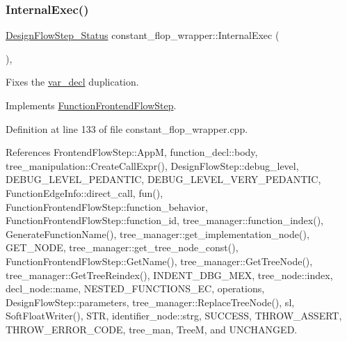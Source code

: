 \subsubsection{\texorpdfstring{Internal\+Exec()}{InternalExec()}}
{\footnotesize\ttfamily \hyperlink{design__flow__step_8hpp_afb1f0d73069c26076b8d31dbc8ebecdf}{Design\+Flow\+Step\+\_\+\+Status} constant\+\_\+flop\+\_\+wrapper\+::\+Internal\+Exec (\begin{DoxyParamCaption}{ }\end{DoxyParamCaption})\hspace{0.3cm}{\ttfamily [override]}, {\ttfamily [virtual]}}



Fixes the \hyperlink{structvar__decl}{var\+\_\+decl} duplication. 



Implements \hyperlink{classFunctionFrontendFlowStep_a00612f7fb9eabbbc8ee7e39d34e5ac68}{Function\+Frontend\+Flow\+Step}.



Definition at line 133 of file constant\+\_\+flop\+\_\+wrapper.\+cpp.



References Frontend\+Flow\+Step\+::\+AppM, function\+\_\+decl\+::body, tree\+\_\+manipulation\+::\+Create\+Call\+Expr(), Design\+Flow\+Step\+::debug\+\_\+level, D\+E\+B\+U\+G\+\_\+\+L\+E\+V\+E\+L\+\_\+\+P\+E\+D\+A\+N\+T\+IC, D\+E\+B\+U\+G\+\_\+\+L\+E\+V\+E\+L\+\_\+\+V\+E\+R\+Y\+\_\+\+P\+E\+D\+A\+N\+T\+IC, Function\+Edge\+Info\+::direct\+\_\+call, fun(), Function\+Frontend\+Flow\+Step\+::function\+\_\+behavior, Function\+Frontend\+Flow\+Step\+::function\+\_\+id, tree\+\_\+manager\+::function\+\_\+index(), Generate\+Function\+Name(), tree\+\_\+manager\+::get\+\_\+implementation\+\_\+node(), G\+E\+T\+\_\+\+N\+O\+DE, tree\+\_\+manager\+::get\+\_\+tree\+\_\+node\+\_\+const(), Function\+Frontend\+Flow\+Step\+::\+Get\+Name(), tree\+\_\+manager\+::\+Get\+Tree\+Node(), tree\+\_\+manager\+::\+Get\+Tree\+Reindex(), I\+N\+D\+E\+N\+T\+\_\+\+D\+B\+G\+\_\+\+M\+EX, tree\+\_\+node\+::index, decl\+\_\+node\+::name, N\+E\+S\+T\+E\+D\+\_\+\+F\+U\+N\+C\+T\+I\+O\+N\+S\+\_\+\+EC, operations, Design\+Flow\+Step\+::parameters, tree\+\_\+manager\+::\+Replace\+Tree\+Node(), sl, Soft\+Float\+Writer(), S\+TR, identifier\+\_\+node\+::strg, S\+U\+C\+C\+E\+SS, T\+H\+R\+O\+W\+\_\+\+A\+S\+S\+E\+RT, T\+H\+R\+O\+W\+\_\+\+E\+R\+R\+O\+R\+\_\+\+C\+O\+DE, tree\+\_\+man, TreeM, and U\+N\+C\+H\+A\+N\+G\+ED.

